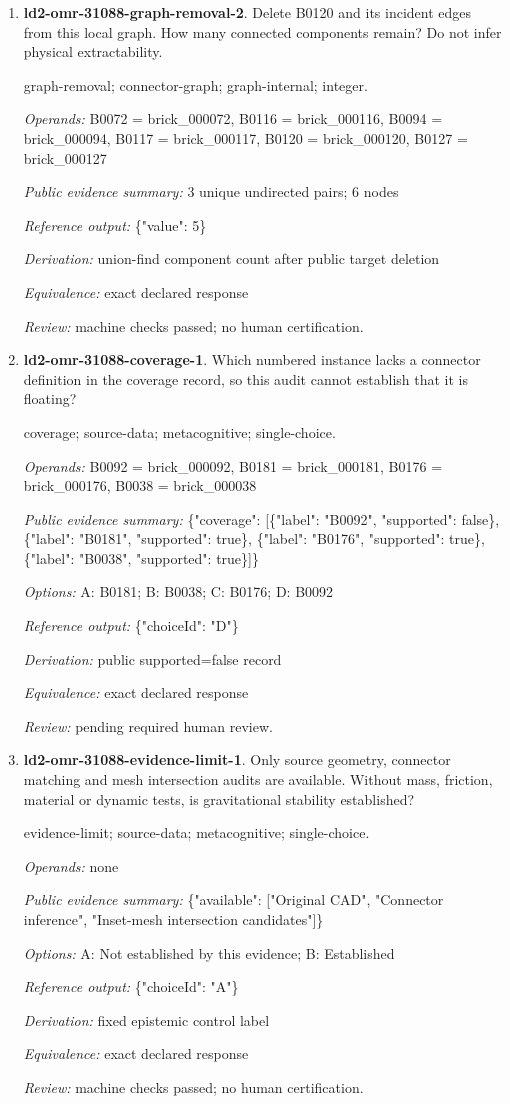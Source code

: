 \begin{enumerate}
\item \textbf{ld2-omr-31088-graph-removal-2}. Delete B0120 and its incident edges from this local graph. How many connected components remain? Do not infer physical extractability.
\par{\small graph-removal; connector-graph; graph-internal; integer.\par\textit{Operands:} B0072 = brick\_000072, B0116 = brick\_000116, B0094 = brick\_000094, B0117 = brick\_000117, B0120 = brick\_000120, B0127 = brick\_000127\par\textit{Public evidence summary:} 3 unique undirected pairs; 6 nodes\par\textit{Reference output:} \{"value": 5\}\par\textit{Derivation:} union-find component count after public target deletion\par\textit{Equivalence:} exact declared response\par\textit{Review:} machine checks passed; no human certification.}
\item \textbf{ld2-omr-31088-coverage-1}. Which numbered instance lacks a connector definition in the coverage record, so this audit cannot establish that it is floating?
\par{\small coverage; source-data; metacognitive; single-choice.\par\textit{Operands:} B0092 = brick\_000092, B0181 = brick\_000181, B0176 = brick\_000176, B0038 = brick\_000038\par\textit{Public evidence summary:} \{"coverage": [\{"label": "B0092", "supported": false\}, \{"label": "B0181", "supported": true\}, \{"label": "B0176", "supported": true\}, \{"label": "B0038", "supported": true\}]\}\par\textit{Options:} A: B0181; B: B0038; C: B0176; D: B0092\par\textit{Reference output:} \{"choiceId": "D"\}\par\textit{Derivation:} public supported=false record\par\textit{Equivalence:} exact declared response\par\textit{Review:} pending required human review.}
\item \textbf{ld2-omr-31088-evidence-limit-1}. Only source geometry, connector matching and mesh intersection audits are available. Without mass, friction, material or dynamic tests, is gravitational stability established?
\par{\small evidence-limit; source-data; metacognitive; single-choice.\par\textit{Operands:} none\par\textit{Public evidence summary:} \{"available": ["Original CAD", "Connector inference", "Inset-mesh intersection candidates"]\}\par\textit{Options:} A: Not established by this evidence; B: Established\par\textit{Reference output:} \{"choiceId": "A"\}\par\textit{Derivation:} fixed epistemic control label\par\textit{Equivalence:} exact declared response\par\textit{Review:} machine checks passed; no human certification.}

\end{enumerate}
